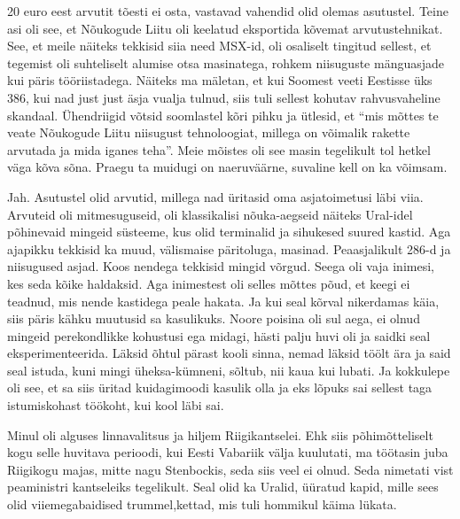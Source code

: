 
20 euro eest arvutit tõesti ei osta, vastavad vahendid olid olemas asutustel. Teine asi oli see, et Nõukogude Liitu oli keelatud eksportida kõvemat arvutustehnikat. See, et meile näiteks tekkisid siia need MSX-id, oli osaliselt tingitud sellest, et tegemist oli suhteliselt alumise otsa masinatega,  rohkem niisuguste mänguasjade kui  päris tööriistadega. Näiteks ma mäletan, et kui Soomest veeti Eestisse üks 386, kui nad just just äsja vualja tulnud,  siis tuli sellest kohutav rahvusvaheline skandaal. Ühendriigid võtsid soomlastel kõri pihku ja ütlesid, et \enquote{mis mõttes te veate Nõukogude Liitu niisugust tehnoloogiat, millega on võimalik rakette arvutada ja mida iganes teha}. Meie mõistes oli see masin tegelikult tol hetkel väga kõva sõna. Praegu ta muidugi on naeruväärne, suvaline kell on ka võimsam.


Jah. Asutustel olid arvutid, millega nad üritasid oma asjatoimetusi läbi viia.
Arvuteid oli mitmesuguseid, oli klassikalisi nõuka-aegseid näiteks Ural-idel põhinevaid mingeid süsteeme, kus olid terminalid ja sihukesed suured kastid.
Aga ajapikku tekkisid ka muud, välismaise päritoluga, masinad. Peaasjalikult 286-d ja niisugused asjad. Koos nendega tekkisid mingid võrgud. Seega oli vaja inimesi, kes seda kõike haldaksid. Aga inimestest oli selles mõttes põud, et keegi ei teadnud, mis nende kastidega peale hakata. Ja kui seal kõrval nikerdamas käia, siis päris kähku muutusid sa kasulikuks. Noore poisina oli sul aega, ei olnud mingeid perekondlikke kohustusi ega midagi, hästi palju huvi oli ja saidki seal eksperimenteerida. Läksid õhtul pärast kooli sinna, nemad läksid töölt ära ja said seal istuda, kuni mingi üheksa-kümneni, sõltub, nii kaua kui lubati. Ja kokkulepe oli see, et sa siis üritad kuidagimoodi kasulik olla ja eks lõpuks sai sellest taga istumiskohast töökoht, kui kool läbi sai.

        
Minul oli alguses linnavalitsus ja hiljem Riigikantselei. Ehk siis põhimõtteliselt kogu selle huvitava perioodi, kui Eesti Vabariik välja kuulutati, ma töötasin juba Riigikogu majas, mitte nagu Stenbockis, seda siis veel ei olnud. Seda nimetati vist peaministri kantseleiks tegelikult. Seal olid ka Uralid, üüratud kapid, mille sees olid viiemegabaidised trummel,kettad, mis tuli hommikul käima lükata.

